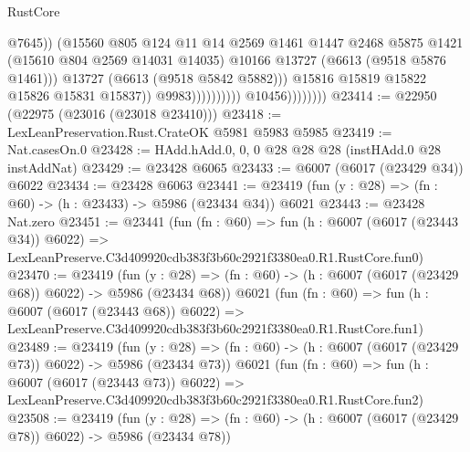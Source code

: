 \begin{lexlean}{RustCore}
\begin{coremodule}
                                                  @7645))
                                              (@15560
                                                @805
                                                @124
                                                @11
                                                @14
                                                @2569
                                                @1461
                                                @1447
                                                @2468
                                                @5875
                                                @1421
                                                (@15610 @804 @2569 @14031 @14035)
                                                @10166
                                                @13727
                                                (@6613 (@9518 @5876 @1461)))
                                              @13727
                                              (@6613 (@9518 @5842 @5882)))
                                            @15816
                                            @15819
                                            @15822
                                            @15826
                                            @15831
                                            @15837))
                                        @9983))))))))))
                    @10456))))))))
@23414 := @22950 (@22975 (@23016 (@23018 @23410)))
@23418 := LexLeanPreservation.Rust.CrateOK @5981 @5983 @5985
@23419 := Nat.casesOn.{0}
@23428 := HAdd.hAdd.{0, 0, 0} @28 @28 @28 (instHAdd.{0} @28 instAddNat)
@23429 := @23428 @6065
@23433 := @6007 (@6017 (@23429 @34)) @6022
@23434 := @23428 @6063
@23441 := @23419 (fun (y : @28) => (fn : @60) -> (h : @23433) -> @5986 (@23434 @34)) @6021
@23443 := @23428 Nat.zero
@23451 := @23441
    (fun (fn : @60) =>
    fun (h : @6007 (@6017 (@23443 @34)) @6022) =>
    LexLeanPreserve.C3d409920cdb383f3b60c2921f3380ea0.R1.RustCore.fun0)
@23470 := @23419
    (fun (y : @28) => (fn : @60) -> (h : @6007 (@6017 (@23429 @68)) @6022) -> @5986 (@23434 @68))
    @6021
    (fun (fn : @60) =>
    fun (h : @6007 (@6017 (@23443 @68)) @6022) =>
    LexLeanPreserve.C3d409920cdb383f3b60c2921f3380ea0.R1.RustCore.fun1)
@23489 := @23419
    (fun (y : @28) => (fn : @60) -> (h : @6007 (@6017 (@23429 @73)) @6022) -> @5986 (@23434 @73))
    @6021
    (fun (fn : @60) =>
    fun (h : @6007 (@6017 (@23443 @73)) @6022) =>
    LexLeanPreserve.C3d409920cdb383f3b60c2921f3380ea0.R1.RustCore.fun2)
@23508 := @23419
    (fun (y : @28) => (fn : @60) -> (h : @6007 (@6017 (@23429 @78)) @6022) -> @5986 (@23434 @78))

\end{coremodule}
\end{lexlean}
